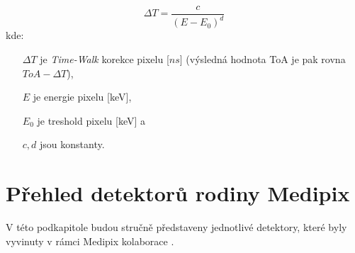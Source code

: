 \begin{equation}\label{eq:det:timeWalk}
	\Delta T = \frac{c}{(E - E_0)^d}
\end{equation}
kde:
\begin{changemargin}{1.5cm}{1cm} 
	\begin{itemize}
		\item [$\Delta T$] je \textit{Time-Walk} korekce pixelu [$ns$] (výsledná hodnota ToA je pak rovna $ToA-\Delta T$),
		\item [$E$] je energie pixelu [keV],
		\item [$E_0$] je treshold pixelu [keV] a
		\item [$c,d$] jsou konstanty.
	\end{itemize}
\end{changemargin}

\section{Přehled detektorů rodiny Medipix}\label{chap:detectors:medipix_overview}
V této podkapitole budou stručně představeny jednotlivé detektory, které byly vyvinuty v rámci Medipix kolaborace \cite{medipix-www}.

